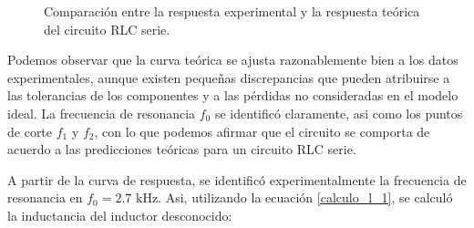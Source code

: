 \begin{figure}[H]
\centering
{}
\caption{Comparación entre la respuesta experimental y la respuesta teórica del circuito RLC serie.}
\label{fig:comparacion_RLC}
\end{figure}

Podemos observar que la curva teórica se ajusta razonablemente bien a los datos experimentales, aunque existen pequeñas discrepancias que pueden atribuirse a las tolerancias de los componentes y a las pérdidas no consideradas en el modelo ideal. La frecuencia de resonancia $f_0$ se identificó claramente, asi como los puntos de corte $f_1$ y $f_2$, con lo que podemos afirmar que el circuito se comporta de acuerdo a las predicciones teóricas para un circuito RLC serie.
\newline

A partir de la curva de respuesta, se identificó experimentalmente la frecuencia de resonancia en $f_0 = 2.7\text{ kHz}$. Asi, utilizando la ecuación \ref{calculo_l_1}, se calculó la inductancia del inductor desconocido:

